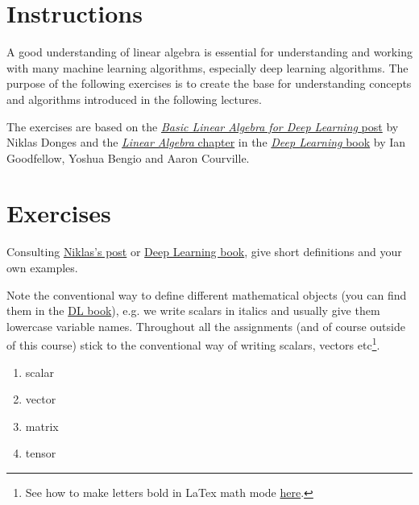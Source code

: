 \def\pathToRoot{../../}
\def\DLbook{https://www.deeplearningbook.org/}
\def\LAchapter{https://www.deeplearningbook.org/contents/linear_algebra.html}
\def\post{https://towardsdatascience.com/linear-algebra-for-deep-learning-f21d7e7d7f23}


\def\issolution{}





\section*{Instructions}

A good understanding of linear algebra is essential for understanding and working with many machine learning algorithms, especially deep learning algorithms.
The purpose of the following exercises is to create the base for understanding concepts and algorithms introduced in the following lectures.

The exercises are based on the \href{\post}{\textit{Basic Linear Algebra for Deep Learning} post} by Niklas Donges and the \href{\LAchapter}{\textit{Linear Algebra} chapter} in the \href{\DLbook}{\textit{Deep Learning} book} by Ian Goodfellow, Yoshua Bengio and Aaron Courville.

\section*{Exercises}

\begin{exercise}
 Consulting \href{\post}{Niklas's post} or \href{\LAchapter}{Deep Learning book}, give short definitions and your own examples.
 
 Note the conventional way to define different mathematical objects (you can find them in the \href{\LAchapter}{DL book}), e.g. we write scalars in italics and usually give them lowercase variable names.
 Throughout all the assignments (and of course outside of this course) stick to the conventional way of writing scalars, vectors etc\footnote{See how to make letters bold in LaTex math mode  \href{https://tex.stackexchange.com/questions/14395/bold-italic-vectors}{here}.}.
 
 \begin{enumerate}
     \item scalar
     \item vector
     \item matrix
     \item tensor
 \end{enumerate}

\end{exercise}


